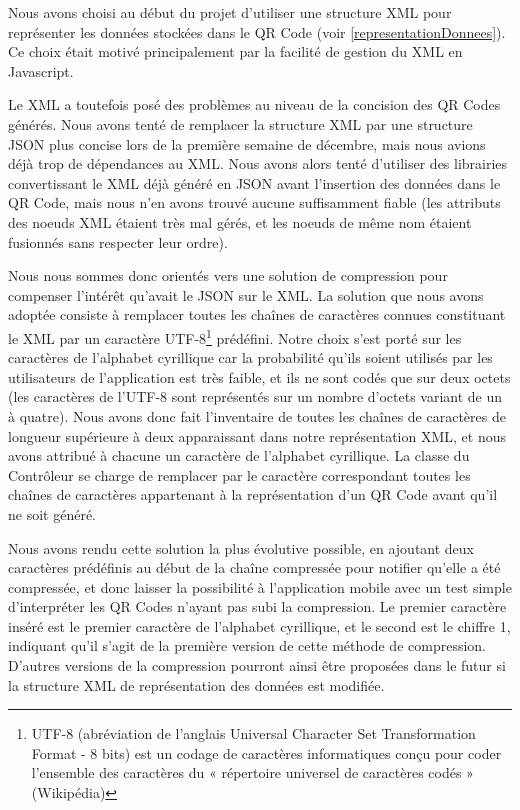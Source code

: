 \par
Nous avons choisi au début du projet d'utiliser une structure XML pour représenter les données stockées dans le QR Code (voir \ref{representationDonnees}). Ce choix était motivé principalement par la facilité de gestion du XML en Javascript.
\par
Le XML a toutefois posé des problèmes au niveau de la concision des QR Codes générés. Nous avons tenté de remplacer la structure XML par une structure JSON plus concise lors de la première semaine de décembre, mais nous avions déjà trop de dépendances au XML. Nous avons alors tenté d'utiliser des librairies convertissant le XML déjà généré en JSON avant l'insertion des données dans le QR Code, mais nous n'en avons trouvé aucune suffisamment fiable (les attributs des noeuds XML étaient très mal gérés, et les noeuds de même nom étaient fusionnés sans respecter leur ordre).\\
\par
Nous nous sommes donc orientés vers une solution de compression pour compenser l'intérêt qu'avait le JSON sur le XML. La solution que nous avons adoptée consiste à remplacer toutes les chaînes de caractères connues constituant le XML par un caractère UTF-8\footnote{UTF-8 (abréviation de l’anglais Universal Character Set Transformation Format - 8 bits) est un codage de caractères informatiques conçu pour coder l’ensemble des caractères du « répertoire universel de caractères codés » (Wikipédia)} prédéfini. Notre choix s'est porté sur les caractères de l'alphabet cyrillique car la probabilité qu'ils soient utilisés par les utilisateurs de l'application est très faible, et ils ne sont codés que sur deux octets (les caractères de l'UTF-8 sont représentés sur un nombre d'octets variant de un à quatre). Nous avons donc fait l'inventaire de toutes les chaînes de caractères de longueur supérieure à deux apparaissant dans notre représentation XML, et nous avons attribué à chacune un caractère de l'alphabet cyrillique. La classe  du Contrôleur se charge de remplacer par le caractère correspondant toutes les chaînes de caractères appartenant à la représentation d'un QR Code avant qu'il ne soit généré.\\
\par
Nous avons rendu cette solution la plus évolutive possible, en ajoutant deux caractères prédéfinis au début de la chaîne compressée pour notifier qu'elle a été compressée, et donc laisser la possibilité à l'application mobile avec un test simple d'interpréter les QR Codes n'ayant pas subi la compression. Le premier caractère inséré est le premier caractère de l'alphabet cyrillique, et le second est le chiffre 1, indiquant qu'il s'agit de la première version de cette méthode de compression. D'autres versions de la compression pourront ainsi être proposées dans le futur si la structure XML de représentation des données est modifiée.\\
